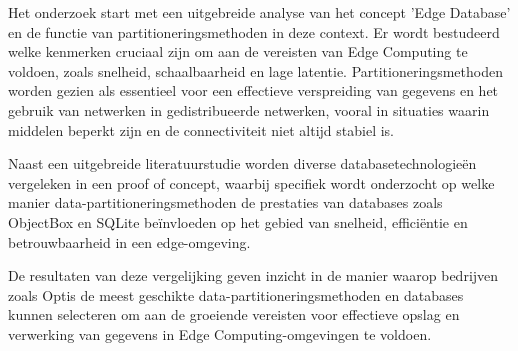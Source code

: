 \documentclass[dutch,dit,thesis]{hogentreport}
\begin{document}
Het onderzoek start met een uitgebreide analyse van het concept 'Edge Database' en de functie van partitioneringsmethoden in deze context. Er wordt bestudeerd welke kenmerken cruciaal zijn om aan de vereisten van Edge Computing te voldoen, zoals snelheid, schaalbaarheid en lage latentie. Partitioneringsmethoden worden gezien als essentieel voor een effectieve verspreiding van gegevens en het gebruik van netwerken in gedistribueerde netwerken,
  vooral in situaties waarin middelen beperkt zijn en de connectiviteit niet altijd stabiel is.

Naast een uitgebreide literatuurstudie worden diverse databasetechnologieën vergeleken in een proof of concept, waarbij specifiek wordt onderzocht op welke manier data-partitioneringsmethoden de prestaties van databases zoals ObjectBox en SQLite beïnvloeden op het gebied van snelheid,
 efficiëntie en betrouwbaarheid in een edge-omgeving.

De resultaten van deze vergelijking geven inzicht in de manier waarop bedrijven zoals Optis de meest geschikte data-partitioneringsmethoden
 en databases kunnen selecteren om aan de groeiende vereisten voor effectieve opslag en verwerking van gegevens in Edge Computing-omgevingen te voldoen.




%


\backmatter{}

\setlength\bibitemsep{2pt} %
\printbibliography[heading=bibintoc]
\end{document}
